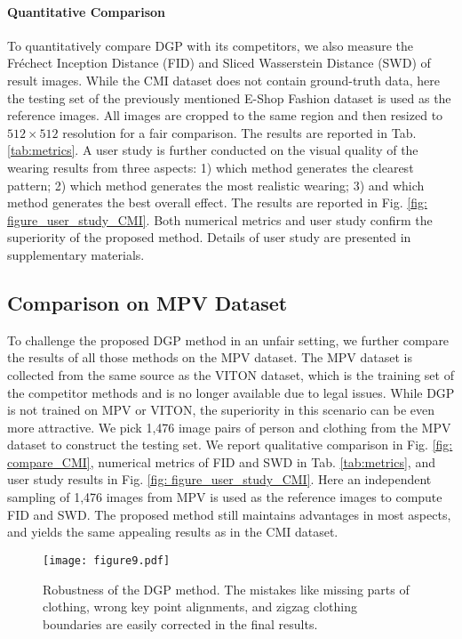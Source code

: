\documentclass[10pt,twocolumn,letterpaper]{article}
\begin{document}
\paragraph{Quantitative Comparison} To quantitatively compare DGP with its competitors, we also measure the Fr\'echect Inception Distance (FID) \cite{heusel2017gans} and Sliced Wasserstein Distance (SWD) \cite{deshpande2018generative,kolouri2018sliced,kolouri2019generalized} of result images. While the CMI dataset does not contain ground-truth data, here the testing set of the previously mentioned E-Shop Fashion dataset is used as the reference images. All images are cropped to the same region and then resized to $512\times512$ resolution for a fair comparison. The results are reported in Tab. \ref{tab:metrics}. A user study is further conducted on the visual quality of the wearing results from three aspects: 1) which method generates the clearest pattern; 2) which method generates the most realistic wearing; 3) and which method generates the best overall effect. The results are reported in Fig. \ref{fig: figure_user_study_CMI}. Both numerical metrics and user study confirm the superiority of the proposed method. Details of user study are presented in supplementary materials.


\subsection{Comparison on MPV Dataset}\label{sec:MPV}
To challenge the proposed DGP method in an unfair setting, we further compare the results of all those methods on the MPV dataset. The MPV dataset is collected from the same source as the VITON dataset, which is the training set of the competitor methods and is no longer available due to legal issues. While DGP is not trained on MPV or VITON, the superiority in this scenario can be even more attractive. We pick 1,476 image pairs of person and clothing from the MPV dataset to construct the testing set. We report qualitative comparison in Fig. \ref{fig: compare_CMI}, numerical metrics of FID and SWD in Tab. \ref{tab:metrics}, and user study results in Fig. \ref{fig: figure_user_study_CMI}. Here an independent sampling of 1,476 images from MPV is used as the reference images to compute FID and SWD. The proposed method still maintains advantages in most aspects, and yields the same appealing results as in the CMI dataset.

\begin{figure}[h]
  \centering
  \texttt{[image: figure9.pdf]}\caption{Robustness of the DGP method. The mistakes like missing parts of clothing, wrong key point alignments, and zigzag clothing boundaries are easily corrected in the final results.}\label{fig: figure_robust}\end{figure}
\end{document}
